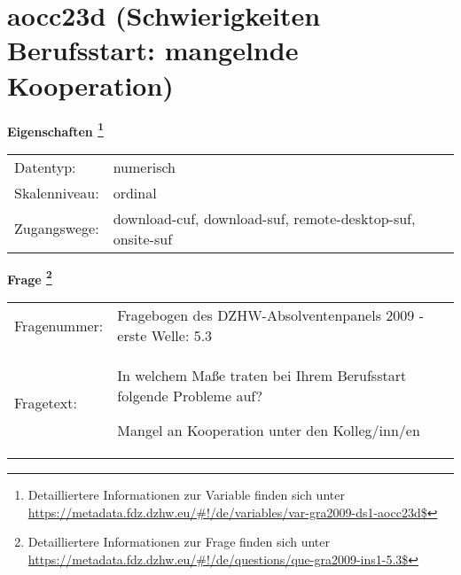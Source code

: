 
    \setcounter{footnote}{0}

    \vspace*{-1.8cm}
	\section{aocc23d (Schwierigkeiten Berufsstart: mangelnde Kooperation)}
	\label{section:aocc23d}



    \vspace*{0.5cm}
    \noindent\textbf{Eigenschaften
	\footnote{Detailliertere Informationen zur Variable finden sich unter
		\url{https://metadata.fdz.dzhw.eu/\#!/de/variables/var-gra2009-ds1-aocc23d$}}}\\
	\begin{tabularx}{\hsize}{@{}lX}
	Datentyp: & numerisch \\
	Skalenniveau: & ordinal \\
	Zugangswege: &
	  download-cuf, 
	  download-suf, 
	  remote-desktop-suf, 
	  onsite-suf
 \\
    \end{tabularx}



				\vspace*{0.5cm}
                \noindent\textbf{Frage
	                \footnote{Detailliertere Informationen zur Frage finden sich unter
		              \url{https://metadata.fdz.dzhw.eu/\#!/de/questions/que-gra2009-ins1-5.3$}}}\\
				\begin{tabularx}{\hsize}{@{}lX}
					Fragenummer: &
					  Fragebogen des DZHW-Absolventenpanels 2009 - erste Welle:
					  5.3
 \\
					Fragetext: & In welchem Maße traten bei Ihrem Berufsstart folgende Probleme auf?\par  Mangel an Kooperation unter den Kolleg/inn/en \\
				\end{tabularx}






